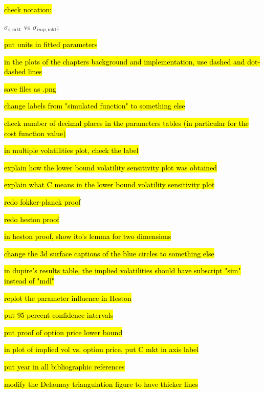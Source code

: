 \hl{check notation:}

$\sigma_{i,\mathrm{mkt}}$ vs $\sigma_{imp,\mathrm{mkt}}$;

\hl{put units in fitted parameters}


\hl{in the plots of the chapters background and implementation, use dashed and dot-dashed lines}

\hl{save files as .png}

\hl{change labels from "simulated function" to something else}

\hl{check number of decimal places in the parameters tables (in particular for the cost function value)}

\hl{in multiple volatilities plot, check the label}

\hl{explain how the  lower bound volatility sensitivity plot was obtained}

\hl{explain what C means in the lower bound volatility sensitivity plot}

\hl{redo fokker-planck proof}

\hl{redo heston proof}

\hl{in heston proof, show ito's lemma for two dimensions}

\hl{change the 3d surface captions of the blue circles to something else}

\hl{in dupire's results table, the implied volatilities should have subscript "sim" instead of "mdl"}

\hl{replot the parameter influence in Heston}

\hl{put 95 percent confidence intervals}

\hl{put proof of option price lower bound}

\hl{in plot of implied vol vs. option price, put C mkt in axis label}

\hl{put year in all bibliographic references}

\hl{modify the Delaunay triangulation figure to have thicker lines}